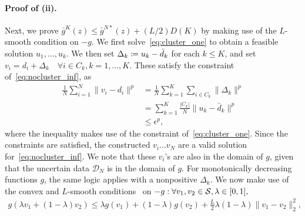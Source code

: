 \paragraph{Proof of (ii).}
Next, we prove $\bar{g}^K(z) \leq \bar{g}^{N*}(z) + (L/2) D(K)$ by making use of the $L$-smooth condition on $-g$. We first solve~\eqref{eq:cluster_one} to obtain a feasible solution $u_1, \dots, u_k$. We then set $\Delta_k \coloneqq u_k - \bar{d}_k$ for each $k \leq K$, and set $v_i = d_i + \Delta_k \quad \forall i \in C_k, k = 1,\dots,K$. These satisfy the constraint of~\eqref{eq:nocluster_inf}, as
\begin{align*}
	\frac{1}{N} \sum_{i=1}^N  \| v_i - d_i \|^p &= \frac{1}{N} \sum_{k=1}^K \sum_{i \in C_k} \|\Delta_k\|^p\\
	&= \sum_{k=1}^K \frac{|C_k|}{N} \|u_k - \bar{d}_k\|^p\\
	&\leq \epsilon^p,
\end{align*}
where the inequality makes use of the constraint of~\eqref{eq:cluster_one}. Since the constraints are satisfied, the constructed $v_i \dots v_N$ are a valid solution for~\eqref{eq:nocluster_inf}.
We note that these $v_i$'s are also in the domain of $g$, given that the uncertain data $\mathcal{D}_N$ is in the domain of $g$.
For monotonically decreasing functions $g$, the same logic applies with a nonpositive $\Delta_k$.
We now make use of the convex and $L$-smooth conditions~\citep[Theorem 5.8]{amirbeck} on $-g: \forall v_1, v_2 \in \mathcal{S}, \lambda \in [0,1],$
\begin{align*}
	g(\lambda v_1 + (1-\lambda) v_2) \leq \lambda g(v_1) + (1 - \lambda)g(v_2) + \frac{L}{2}\lambda(1 - \lambda)\| v_1 - v_2 \|^2_2,
\end{align*}
